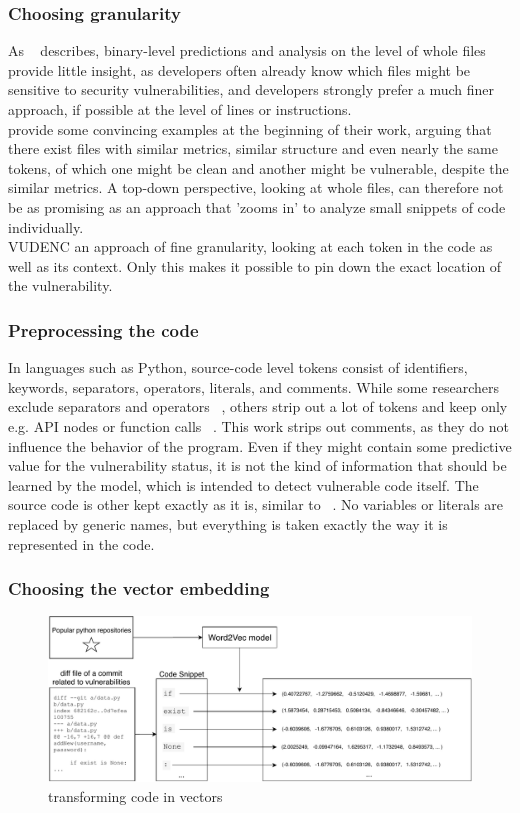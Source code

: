 \documentclass[
	a4paper,
	pagesize,
	pdftex,
	12pt,
	twoside, %
	BCOR=5mm, %
	ngerman,
	fleqn,
	final,
	]{scrartcl}
\begin{document}
\subsubsection{Choosing granularity}
As ~\cite{Morrison.2015} describes, binary-level predictions and analysis on the level of whole files provide little insight, as developers often already know which files might be sensitive to security vulnerabilities, and developers strongly prefer a much finer approach, if possible at the level of lines or instructions.\\
\cite{Dam.2017} provide some convincing examples at the beginning of their work, arguing that there exist files with similar metrics, similar structure and even nearly the same tokens, of which one might be clean and another might be vulnerable, despite the similar metrics. A top-down perspective, looking at whole files, can therefore not be as promising as an approach that 'zooms in' to analyze small snippets of code individually.\\
VUDENC an approach of fine granularity, looking at each token in the code as well as its context. Only this makes it possible to pin down the exact location of the vulnerability. 

\subsubsection{Preprocessing the code}
In languages such as Python, source-code level tokens consist of identifiers, keywords, separators, operators, literals, and comments. While some researchers exclude separators and operators ~\cite{Pang.2015}, others strip out a lot of tokens and keep only e.g. API nodes or function calls ~\cite{Yamaguchi.2012}. This work strips out comments, as they do not influence the behavior of the program. Even if they might contain some predictive value for the vulnerability status, it is not the kind of information that should be learned by the model, which is intended to detect vulnerable code itself. The source code is other kept exactly as it is, similar to  ~\cite{Hovsepyan.2012}. No variables or literals are replaced by generic names, but everything is taken  exactly the way it is represented in the code. 

\subsubsection{Choosing the vector embedding}
\begin{figure}[ht]
	\centering
	\includegraphics[width=\linewidth]{img/Word2Vec}
	\caption{transforming code in vectors}
	\label{fig:word2vec}
\end{figure}
\end{document}
